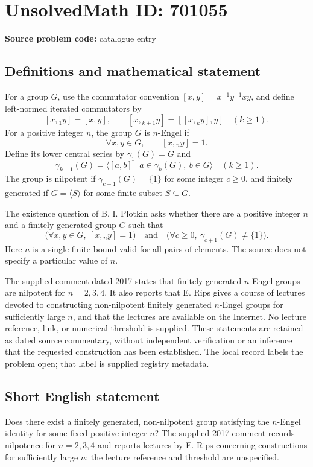 \documentclass[11pt]{article}
\begin{document}
\section*{UnsolvedMath ID: 701055}
\textbf{Source problem code:} catalogue entry
\subsection{Definitions and mathematical statement}
For a group \(G\), use the commutator convention \([x,y]=x^{-1}y^{-1}xy\), and define left-normed iterated commutators by
\[
[x,{}_1y]=[x,y],\qquad [x,{}_{k+1}y]=[[x,{}_ky],y]\quad(k\geq 1).
\]
For a positive integer \(n\), the group \(G\) is \(n\)-Engel if
\[
\forall x,y\in G,\qquad [x,{}_ny]=1.
\]
Define its lower central series by \(\gamma_1(G)=G\) and
\[
\gamma_{k+1}(G)=\langle [a,b]\mid a\in\gamma_k(G),\ b\in G\rangle\quad(k\geq 1).
\]
The group is nilpotent if \(\gamma_{c+1}(G)=\{1\}\) for some integer \(c\geq 0\), and finitely generated if \(G=\langle S\rangle\) for some finite subset \(S\subseteq G\).

The existence question of B. I. Plotkin asks whether there are a positive integer \(n\) and a finitely generated group \(G\) such that
\[
\bigl(\forall x,y\in G,\ [x,{}_ny]=1\bigr)
\quad\text{and}\quad
\bigl(\forall c\geq 0,\ \gamma_{c+1}(G)\neq\{1\}\bigr).
\]
Here \(n\) is a single finite bound valid for all pairs of elements. The source does not specify a particular value of \(n\).

The supplied comment dated 2017 states that finitely generated \(n\)-Engel groups are nilpotent for \(n=2,3,4\). It also reports that E. Rips gives a course of lectures devoted to constructing non-nilpotent finitely generated \(n\)-Engel groups for sufficiently large \(n\), and that the lectures are available on the Internet. No lecture reference, link, or numerical threshold is supplied. These statements are retained as dated source commentary, without independent verification or an inference that the requested construction has been established. The local record labels the problem open; that label is supplied registry metadata.
\subsection{Short English statement}
Does there exist a finitely generated, non-nilpotent group satisfying the \(n\)-Engel identity for some fixed positive integer \(n\)? The supplied 2017 comment records nilpotence for \(n=2,3,4\) and reports lectures by E. Rips concerning constructions for sufficiently large \(n\); the lecture reference and threshold are unspecified.
\end{document}
